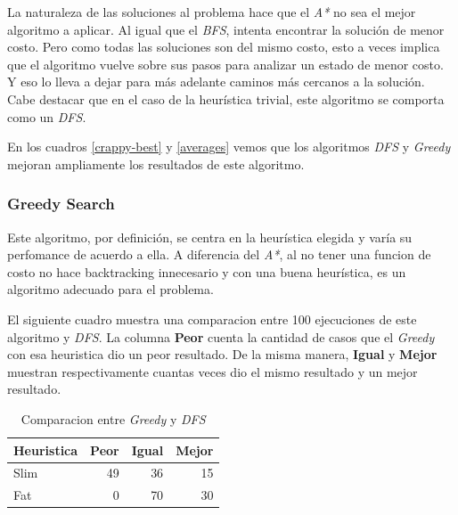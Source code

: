 \documentclass[a4paper,10pt]{article}
\begin{document}
    La naturaleza de las soluciones al problema hace que el \textit{A*} no sea el mejor algoritmo a aplicar. Al igual que el \textit{BFS}, intenta encontrar la solución de menor costo.
    Pero como todas las soluciones son del mismo costo, esto a veces implica que el algoritmo vuelve sobre sus pasos para analizar un estado de menor costo.
    Y eso lo lleva a dejar para más adelante caminos más cercanos a la solución. \\
    Cabe destacar que en el caso de la heurística trivial, este algoritmo se comporta como un \textit{DFS}.

    En los cuadros \ref{crappy-best} y \ref{averages} vemos que los algoritmos \textit{DFS} y \textit{Greedy} mejoran ampliamente los resultados de este algoritmo.

    \subsubsection{Greedy Search}
    
    Este algoritmo, por definición, se centra en la heurística elegida y varía su perfomance de acuerdo a ella.
    A diferencia del \textit{A*}, al no tener una funcion de costo no hace backtracking innecesario y con una buena heurística, es un algoritmo adecuado para el problema.

    El siguiente cuadro muestra una comparacion entre 100 ejecuciones de este algoritmo y \textit{DFS}.
    La columna \textbf{Peor} cuenta la cantidad de casos que el \textit{Greedy} con esa heuristica dio un peor resultado.
    De la misma manera, \textbf{Igual} y \textbf{Mejor} muestran respectivamente cuantas veces dio el mismo resultado y un mejor resultado.

    \begin{table}[H]
        \label{greedy-dfs}

        \begin{center}
        \begin{tabular}{l|r|r|r}
            Heuristica & Peor & Igual & Mejor \\
            \hline
            Slim & 49 & 36 & 15 \\
            Fat & 0 & 70 & 30 \\
        \end{tabular}
        \end{center}
        \caption{Comparacion entre \textit{Greedy} y \textit{DFS}}

    \end{table}
\end{document}
